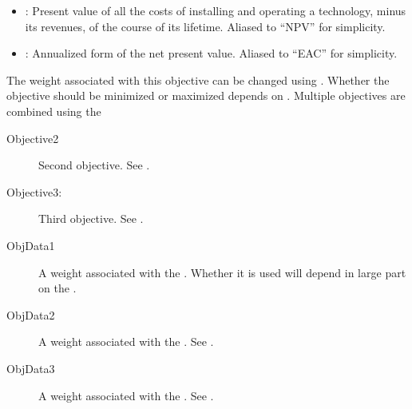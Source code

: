 \documentclass[letterpaper,10pt,english]{sphinxmanual}
\begin{document}
\begin{description}
\begin{itemize}
\item {} 
: Present value of all the costs of
installing and operating a technology, minus its revenues, of the course of its
lifetime. Aliased to “NPV” for simplicity.

\item {} 
: Annualized form of the
net present value. Aliased to “EAC” for simplicity.

\end{itemize}

The weight associated with this objective can be changed using {\hyperref[\detokenize{inputs/agents:objdata1}]{}}.  Whether the objective should be minimized or maximized depends on
{\hyperref[\detokenize{inputs/agents:objsort1}]{}}. Multiple objectives are combined using the
{\hyperref[\detokenize{inputs/agents:decisionmethod}]{}}

\end{description}
\label{\detokenize{inputs/agents:objective2}}\begin{description}
\item[{Objective2}] \leavevmode
Second objective. See {\hyperref[\detokenize{inputs/agents:objective1}]{}}.

\end{description}
\label{\detokenize{inputs/agents:objective3}}\begin{description}
\item[{Objective3:}] \leavevmode
Third objective. See {\hyperref[\detokenize{inputs/agents:objective1}]{}}.

\end{description}
\label{\detokenize{inputs/agents:objdata1}}\begin{description}
\item[{ObjData1}] \leavevmode
A weight associated with the {\hyperref[\detokenize{inputs/agents:objective1}]{}}. Whether it is used
will depend in large part on the {\hyperref[\detokenize{inputs/agents:decisionmethod}]{}}.

\item[{ObjData2}] \leavevmode
A weight associated with the {\hyperref[\detokenize{inputs/agents:objective2}]{}}. See {\hyperref[\detokenize{inputs/agents:objdata1}]{}}.

\item[{ObjData3}] \leavevmode
A weight associated with the {\hyperref[\detokenize{inputs/agents:objective3}]{}}. See {\hyperref[\detokenize{inputs/agents:objdata1}]{}}.

\end{description}
\end{document}
